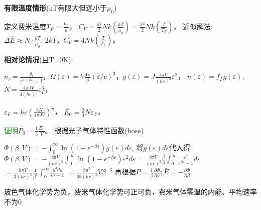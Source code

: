 \documentclass[a4paper,8pt]{extarticle} %
\newcommand{\greentext}[1]{\textcolor{green}{#1}}
\begin{document}
\begin{multicols}{3}


\textbf{有限温度情形}(kT有限大但远小于$\mu_0$)

定义费米温度$T_F = \frac{\mu_0}{k}$，
$C_V = \frac{\pi^2}{2}Nk\left(\frac{kT}{\mu_0}\right) = \frac{\pi^2}{2}Nk\left(\frac{T}{T_F}\right)$，
近似解法: $\Delta\bar{E} \approx N\cdot\frac{kT}{\mu_0}\cdot 2kT$，$C_V = 4Nk\left(\frac{T}{T_F}\right)$。

\textbf{相对论情况}(且T=0K):

$n_i = \frac{g_i}{e^{\alpha+\beta\varepsilon_i}+1}$，$\Omega(\varepsilon)=V\frac{4\pi}{3}(\varepsilon/c)^3$，$g(\varepsilon) = J\frac{4\pi V}{(hc)^3}\varepsilon^2$，
$n(\varepsilon)=f_Fg(\varepsilon)$,$N = \frac{4\pi JV}{3(hc)^3}\varepsilon_F^3$，

$\varepsilon_F = hc\left(\frac{3N}{4\pi JV}\right)^{\frac{1}{3}}$，
$\bar{E_0} = \frac{3}{4}N\varepsilon_F$，

\greentext{证明}$\bar{P_0} = \frac{1}{3}\frac{\bar{E_0}}{V}$。
根据光子气体特性函数(bose)

$\Phi(\beta,V) = -\int_0^{\infty}\ln(1-e^{-\beta\varepsilon})g(\varepsilon)d\varepsilon$, 将$g(\varepsilon)d\varepsilon$代入得
$\Phi(\beta,V) = -\frac{8\pi V}{(hc)^3}\int_0^{\infty}\ln(1-e^{-\beta\varepsilon})\varepsilon^2d\varepsilon = \frac{8\pi V}{(hc)^3}\frac{\beta}{3}\int_0^{\infty}\frac{\varepsilon^3}{e^{\beta\varepsilon}-1}d\varepsilon$
$= \frac{8\pi V}{3(hc)^3}\frac{1}{\beta^3}\int_0^{\infty}\frac{y^3dy}{e^y-1}$
$=\frac{8\pi^5}{45(hc)^3}V\beta^{-3}$
再根据$P = \frac{1}{\beta}\frac{\partial\Phi}{\partial V};\bar{E} = -\frac{\partial\Phi}{\partial\beta}$

玻色气体化学势为负，费米气体化学势可正可负，费米气体零温的内能、平均速率不为0
\end{multicols}
\end{document}
